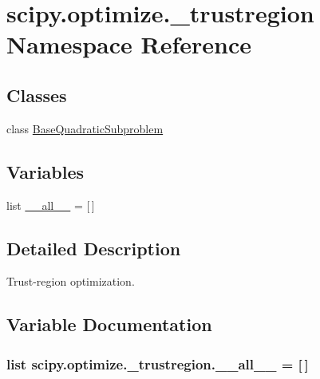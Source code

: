 \hypertarget{namespacescipy_1_1optimize_1_1__trustregion}{}\section{scipy.\+optimize.\+\_\+trustregion Namespace Reference}
\label{namespacescipy_1_1optimize_1_1__trustregion}
\subsection*{Classes}
\begin{DoxyCompactItemize}
\item 
class \hyperlink{classscipy_1_1optimize_1_1__trustregion_1_1BaseQuadraticSubproblem}{Base\+Quadratic\+Subproblem}
\end{DoxyCompactItemize}
\subsection*{Variables}
\begin{DoxyCompactItemize}
\item 
list \hyperlink{namespacescipy_1_1optimize_1_1__trustregion_abe1d93447bf303d48e40098dcf79b130}{\+\_\+\+\_\+all\+\_\+\+\_\+} = \mbox{[}$\,$\mbox{]}
\end{DoxyCompactItemize}


\subsection{Detailed Description}
\begin{DoxyVerb}Trust-region optimization.\end{DoxyVerb}
 

\subsection{Variable Documentation}
\hypertarget{namespacescipy_1_1optimize_1_1__trustregion_abe1d93447bf303d48e40098dcf79b130}{}
\subsubsection[{\+\_\+\+\_\+all\+\_\+\+\_\+}]{\setlength{\rightskip}{0pt plus 5cm}list scipy.\+optimize.\+\_\+trustregion.\+\_\+\+\_\+all\+\_\+\+\_\+ = \mbox{[}$\,$\mbox{]}}\label{namespacescipy_1_1optimize_1_1__trustregion_abe1d93447bf303d48e40098dcf79b130}
